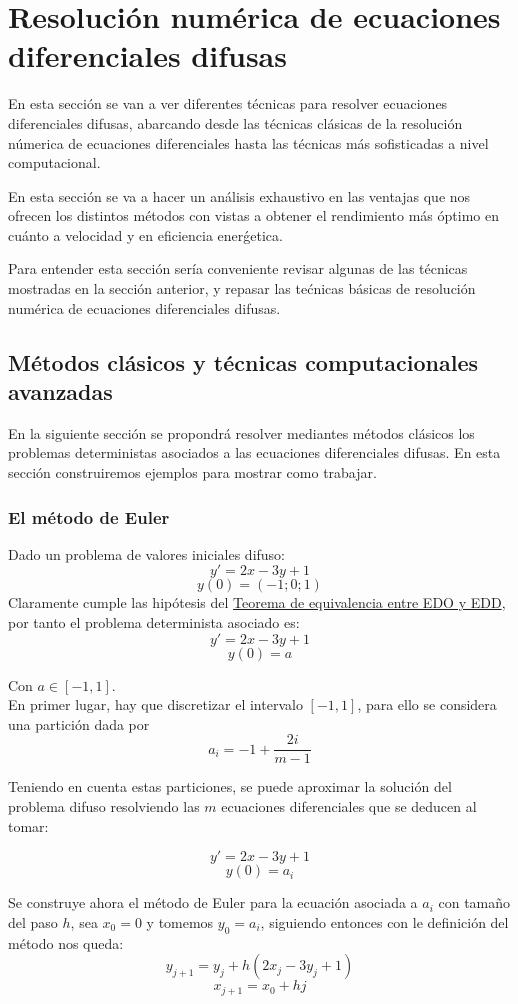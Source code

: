 \chapter{Resolución numérica de ecuaciones diferenciales difusas}
En esta sección se van a ver diferentes técnicas para resolver ecuaciones diferenciales difusas, abarcando desde las técnicas clásicas de la resolución númerica de ecuaciones diferenciales hasta las técnicas más sofisticadas a nivel computacional.

En esta sección se va a hacer un análisis exhaustivo en las ventajas que nos ofrecen los distintos métodos con vistas a obtener el rendimiento más óptimo en cuánto a velocidad y en eficiencia enerǵetica.

Para entender esta sección sería conveniente revisar algunas de las técnicas mostradas en la sección anterior, y repasar las tećnicas básicas de resolución numérica de ecuaciones diferenciales difusas.

\section{Métodos clásicos y técnicas computacionales avanzadas}
En la siguiente sección se propondrá resolver mediantes métodos clásicos los problemas deterministas asociados a las ecuaciones diferenciales difusas. En esta sección construiremos ejemplos para mostrar como trabajar.

\subsection{El método de Euler}
Dado un problema de valores iniciales difuso:
\[
	y' = 2x - 3y + 1
\]
\[
	y(0) = (-1;0;1)
\]
Claramente cumple las hipótesis del \hyperref[teorema:equivalencia]{Teorema de equivalencia entre EDO y EDD}, por tanto el problema determinista asociado es:
\[
	y' = 2x - 3y + 1
\]
\[
	y(0) = a
\]

Con $a \in [-1, 1]$. \\
En primer lugar, hay que discretizar el intervalo $[-1, 1]$, para ello se considera una partición dada por 
\[
	a_i = -1 + \frac{2i}{m-1}
\]

Teniendo en cuenta estas particiones, se puede aproximar la solución del problema difuso resolviendo las $m$ ecuaciones diferenciales que se deducen al tomar:

\[
	y' = 2x - 3y + 1
\]
\[
	y(0) = a_i
\]

Se construye ahora el método de Euler para la ecuación asociada a $a_i$ con tamaño del paso $h$, sea $x_0=0$ y tomemos $y_0 = a_i$, siguiendo entonces con le definición del método nos queda:
\[
	y_{j+1} = y_j + h (2x_j - 3y_j + 1)
\]
\[
	x_{j+1} = x_0 + hj
\]

